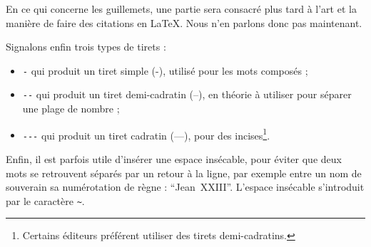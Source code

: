 En ce qui concerne les guillemets, une partie sera consacré plus tard à l'art et la manière de faire des citations en \LaTeX. Nous n'en parlons donc pas maintenant.

Signalons enfin trois types de tirets :
\begin{itemize}
\item \verb|-| qui produit un tiret simple (-), utilisé pour les mots composés ;
\item \verb|--| qui produit un tiret demi-cadratin (--), en théorie à utiliser pour séparer une plage de nombre ;
\item \verb|---| qui produit un tiret cadratin (---), pour des incises\footnote{Certains éditeurs préférent utiliser des tirets demi-cadratins.}.
\end{itemize}
 
Enfin, il est parfois utile d'insérer une espace insécable, pour éviter que deux mots se retrouvent séparés par un retour à la ligne, par exemple entre un nom de souverain sa numérotation de règne : \enquote{Jean~XXIII}.  L'espace insécable s'introduit par le caractère \verb|~|.









%






